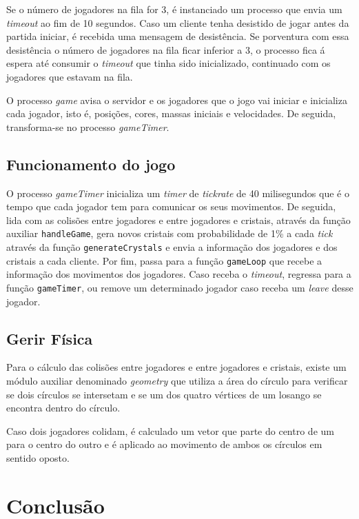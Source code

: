 \documentclass[11pt,a4paper]{report}
\begin{document}
Se o número de jogadores na fila for 3, é instanciado um processo que envia um \textit{timeout} ao fim de 10 segundos. Caso um cliente tenha desistido de jogar antes da partida iniciar, é recebida uma mensagem de desistência. Se porventura com essa desistência o número de jogadores na fila ficar inferior a 3, o processo fica á espera até consumir o \textit{timeout} que tinha sido inicializado, continuado com os jogadores que estavam na fila.

O processo \textit{game} avisa o servidor e os jogadores que o jogo vai iniciar e inicializa cada jogador, isto é, posições, cores, massas iniciais e velocidades. De seguida, transforma-se no processo \textit{gameTimer}.

\section{Funcionamento do jogo}
O processo \textit{gameTimer} inicializa um \textit{timer} de \textit{tickrate} de 40 milisegundos que é o tempo que cada jogador tem para comunicar os seus movimentos. De seguida, lida com as colisões entre jogadores e entre jogadores e cristais, através da função auxiliar \texttt{handleGame}, gera novos cristais com probabilidade de 1\% a cada \textit{tick}  através da função \texttt{generateCrystals} e envia a informação dos jogadores e dos cristais a cada cliente.
Por fim, passa para a função \texttt{gameLoop} que recebe a informação dos movimentos dos jogadores. Caso receba o \textit{timeout}, regressa para a função \texttt{gameTimer}, ou remove um determinado jogador caso receba um \textit{leave} desse jogador.

\section{Gerir Física}
Para o cálculo das colisões entre jogadores e entre jogadores e cristais, existe um módulo auxiliar denominado \textit{geometry} que utiliza a área do círculo para verificar se dois círculos se intersetam e se um dos quatro vértices de um losango se encontra dentro do círculo. 

Caso dois jogadores colidam, é calculado um vetor que parte do centro de um para o centro do outro e é aplicado ao movimento de ambos os círculos em sentido oposto.









\chapter{Conclusão}
\end{document}

